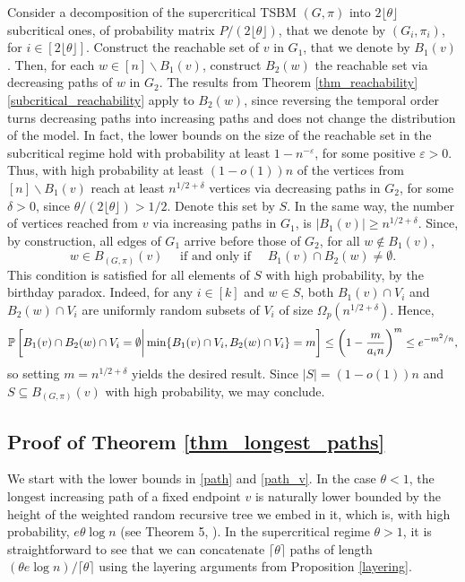 \documentclass[11pt]{article}
\numberwithin{equation}{section}
\theoremstyle{definition}
\newcommand\bP{{\mathbb P}}
\begin{document}
Consider a decomposition of the supercritical TSBM $(G,\pi)$ into $2\lfloor \theta \rfloor$ subcritical ones, of probability matrix $P/(2\lfloor \theta \rfloor)$, that we denote by $(G_i,\pi_i)$, for $i \in [2\lfloor \theta \rfloor]$. Construct the reachable set of $v$ in $G_1$, that we denote by $B_1(v)$. Then, for each $w \in [n] \backslash B_1(v)$, construct $B_2(w)$ the reachable set via decreasing paths of $w$ in $G_2$. The results from Theorem \ref{thm_reachability}\ref{subcritical_reachability} apply to $B_2(w)$, since reversing the temporal order turns decreasing paths into increasing paths and does not change the distribution of the model. In fact, the lower bounds on the size of the reachable set in the subcritical regime hold with probability at least $1-n^{-\varepsilon}$, for some positive $\varepsilon > 0$. Thus, with high probability at least $(1-o(1))n$ of the vertices from $[n]\backslash B_1(v)$ reach at least $n^{1/2+\delta}$ vertices via decreasing paths in $G_2$, for some $\delta >0$, since $\theta/(2\lfloor \theta \rfloor) > 1/2$. Denote this set by $S$. In the same way, the number of vertices reached from $v$ via increasing paths in $G_1$, is $|B_1(v)| \geq n^{1/2 + \delta}$. Since, by construction, all edges of $G_1$ arrive before those of $G_2$, for all $w \notin B_1(v)$,
$$w \in B_{(G,\pi)}(v) \quad \textrm{ if and only if } \quad B_1(v)\cap B_2(w) \neq \emptyset. $$
This condition is satisfied for all elements of $S$ with high probability, by the birthday paradox. Indeed, for any $i \in [k]$ and $w\in S$, both $B_1(v)\cap V_i$ and $B_2(w)\cap V_i$ are uniformly random subsets of $V_i$ of size $\Omega_p(n^{1/2+\delta})$. Hence,
$$\bP\left[B_1(v)\cap B_2(w)\cap V_i = \emptyset\bigg{|}\min\{B_1(v)\cap V_i,B_2(w)\cap V_i\}= m\right] \leq \left( 1-\frac{m}{a_i n} \right)^{m} \leq e^{-m^{2}/n}, $$
so setting $m = n^{1/2+\delta}$ yields the desired result. Since $|S| = (1-o(1))n$ and $S \subseteq B_{(G,\pi)}(v)$ with high probability, we may conclude.
\subsection{Proof of Theorem \ref{thm_longest_paths}}
\label{section:longest_paths}

We start with the lower bounds in \ref{path} and \ref{path_v}. In the case $\theta<1$, the longest increasing path of a fixed endpoint $v$ is naturally lower bounded by the height of the weighted random recursive tree we embed in it, which is, with high probability, $e\theta \log n$ (see Theorem 5, \cite{S18}). In the supercritical regime $\theta > 1$, it is straightforward to see that we can concatenate $\lceil \theta \rceil$ paths of length $(\theta e \log n )/ \lceil \theta \rceil$ using the layering arguments from Proposition \ref{layering}. \\
\end{document}
